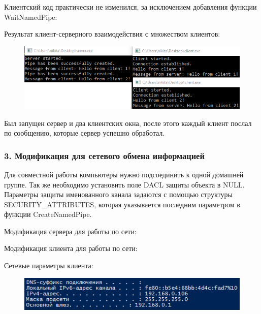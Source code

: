 \documentclass[14pt,a4paper,report]{report}
\begin{document}


Клиентский код практически не изменился, за исключением добавления функции WaitNamedPipe:



Результат клиент-серверного взаимодействия с множеством клиентов:

\begin{figure}[h!]
	\centering
	\includegraphics[scale = 0.95]{images/p2_2.png}
	
	\caption{}
	\label{image:5}
\end{figure}

Был запущен сервер и два клиентских окна, после этого каждый клиент послал по сообщению, которые сервер успешно обработал.

\subsubsection{3. Модификация для сетевого обмена информацией}

Для совместной работы компьютеры нужно подсоединить к одной домашней группе. Так же необходимо установить поле DACL защиты объекта в NULL. Параметры защиты именованного канала задаются с помощью структуры SECURITY\_ATTRIBUTES, которая указывается последним параметром в функции CreateNamedPipe.

Модификация сервера для работы по сети:



Модификация клиента для работы по сети:



Сетевые параметры клиента:

\begin{figure}[h!]
	\centering
	\includegraphics[scale = 0.85]{images/p2_3_client_config.png}
	
	\caption{}
	\label{image:6}
\end{figure}
\end{document}

